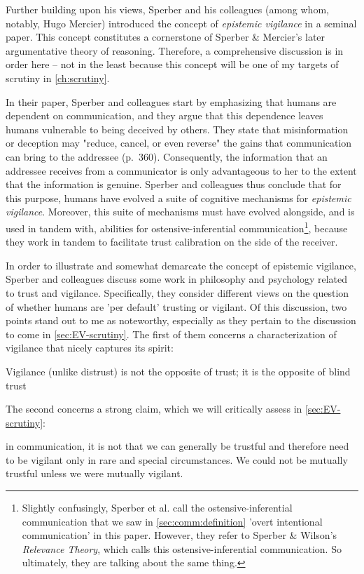 Further building upon his \citeyear{Sperber01} views, Sperber and his colleagues (among whom, notably, Hugo Mercier) introduced the concept of \emph{epistemic vigilance} in a seminal \citeyear{Sperber10} paper. This concept constitutes a cornerstone of Sperber \& Mercier's later argumentative theory of reasoning. Therefore, a comprehensive discussion is in order here -- not in the least because this concept will be one of my targets of scrutiny in \cref{ch:scrutiny}.

In their \citeyear{Sperber10} paper, Sperber and colleagues start by emphasizing that humans are dependent on communication, and they argue that this dependence leaves humans vulnerable to being deceived by others.
They state that misinformation or deception may "reduce, cancel, or even reverse" the gains that communication can bring to the addressee (p.~360).
Consequently, the information that an addressee receives from a communicator is only advantageous to her to the extent that the information is genuine.
Sperber and colleagues thus conclude that for this purpose, humans have evolved a suite of cognitive mechanisms for \emph{epistemic vigilance}.
Moreover, this suite of mechanisms must have evolved alongside, and is used in tandem with, abilities for ostensive-inferential communication\footnote{Slightly confusingly, Sperber et al. call the ostensive-inferential communication that we saw in \cref{sec:comm:definition} 'overt intentional communication' in this paper. However, they refer to Sperber \& Wilson's \emph{Relevance Theory}, which calls this ostensive-inferential communication. So ultimately, they are talking about the same thing.}, because they work in tandem to facilitate trust calibration on the side of the receiver.

In order to illustrate and somewhat demarcate the concept of epistemic vigilance, Sperber and colleagues discuss some work in philosophy and psychology related to trust and vigilance. Specifically, they consider different views on the question of whether humans are 'per default' trusting or vigilant.
Of this discussion, two points stand out to me as noteworthy, especially as they pertain to the discussion to come in \cref{sec:EV-scrutiny}. The first of them concerns a characterization of vigilance that nicely captures its spirit:
\begin{quoting}
    Vigilance (unlike distrust) is not the opposite of trust; it is the opposite
of blind trust
    \hfill \citep[p.~363]{Sperber10}
\end{quoting}
The second concerns a strong claim, which we will critically assess in \cref{sec:EV-scrutiny}:
\begin{quoting}
    in communication, it is not that we can generally be trustful and therefore need to be vigilant only in rare and special circumstances. We could not be mutually trustful unless we were mutually vigilant.
    \hfill \citep[p.~364]{Sperber10}
\end{quoting}

